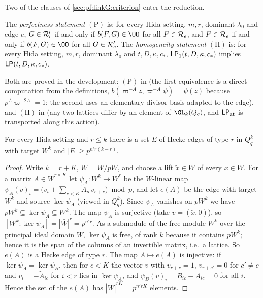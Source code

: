 Two of the clauses of \cref{sec:pf:linkG:criterion} enter the reduction.

\begin{definition}\label{pf:linkG:perfect}
The \emph{perfectness statement} $(\mathrm P)$ is: for every Hida setting, $m,r$, dominant $\lambda_0$ and edge $e$,
$G\in\mathcal R'_e$ if and only if $b(F,G)\in\OO$ for all $F\in\mathcal R_e$, and $F\in\mathcal R_e$ if and only if $b(F,G)\in\OO$
for all $G\in\mathcal R'_e$. The \emph{homogeneity statement} $(\mathrm H)$ is: for every Hida setting, $m,r$, dominant
$\lambda_0$ and $t,D,\kappa,c_*$, $\mathsf{LP}_1(t,D,\kappa,c_*)$ implies $\mathsf{LP}(t,D,\kappa,c_*)$.
\end{definition}

Both are proved in the development: $(\mathrm P)$ in  (the first
equivalence is a direct computation from the definitions, $b(\varpi^{-A}z,\varpi^{-A}\psi)=\psi(z)$ because
$p^A\varpi^{-2A}=1$; the second uses an elementary divisor basis adapted to the edge), and $(\mathrm H)$ in
 (any two lattices differ by an element of $\GL_k(Q_q)$, and
$\mathsf{LP}_{\mathrm{at}}$ is transported along this action).

\begin{lemma}\label{pf:linkG:manyedges}
For every Hida setting and $r\le k$ there is a set $E$ of Hecke edges of type $r$ in $Q_q^k$ with target $W^k$ and
$|E|\ge p^{n'r(k-r)}$.
\end{lemma}

\begin{proof}
Write $k=r+K$, $\bar W=W/pW$, and choose a lift $\tilde x\in W$ of every $x\in\bar W$. For a matrix
$A\in\bar W^{r\times K}$ let $\psi_A:W^k\to\bar W^r$ be the $W$-linear map
$\psi_A(v)_i=\bigl(v_i+\sum_{c<K}\tilde A_{ic}v_{r+c}\bigr)\bmod p$, and let $e(A)$ be the edge with target $W^k$ and
source $\ker\psi_A$ (viewed in $Q_q^k$). Since $\psi_A$ vanishes on $pW^k$ we have $pW^k\subseteq\ker\psi_A\subseteq
W^k$. The map $\psi_A$ is surjective (take $v=(\tilde x,0)$), so $[W^k:\ker\psi_A]=|\bar W|^r=p^{n'r}$. As a
submodule of the free module $W^k$ over the principal ideal domain $W$, $\ker\psi_A$ is free, of rank $k$ because it
contains $pW^k$; hence it is the span of the columns of an invertible matrix, i.e.\ a lattice. So $e(A)$ is a Hecke
edge of type $r$. The map $A\mapsto e(A)$ is injective: if $\ker\psi_A=\ker\psi_B$, then for $c<K$ the vector $v$
with $v_{r+c}=1$, $v_{r+c'}=0$ for $c'\ne c$ and $v_i=-\tilde A_{ic}$ for $i<r$ lies in $\ker\psi_A$, and
$\psi_B(v)_i=B_{ic}-A_{ic}=0$ for all $i$. Hence the set of the $e(A)$ has $|\bar W|^{rK}=p^{n'rK}$ elements.
\end{proof}

